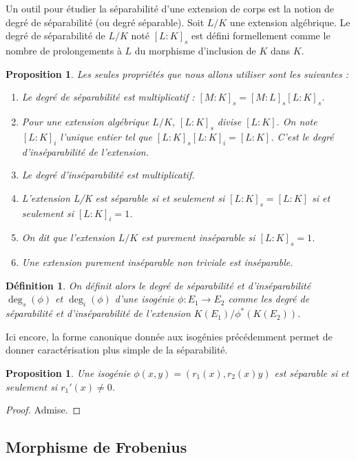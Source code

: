 \documentclass{article}
\theoremstyle{plain}%
\newtheorem{prop}[thm]{Proposition}
\newtheorem{deff}[thm]{Définition}
\theoremstyle{definition}%
\begin{document}
Un outil pour étudier la séparabilité d’une extension de corps est la notion de degré de séparabilité (ou
degré séparable). Soit $L/K$ une extension algébrique. Le degré de séparabilité de $L/K$ noté  $[L : K]_s$ est défini
formellement comme le nombre de prolongements à $L$ du morphisme d’inclusion de $K$ dans $K$. 

\begin{prop}
Les seules
propriétés que nous allons utiliser sont les suivantes :
  \begin{enumerate}
    \item Le degré de séparabilité est multiplicatif : $[M : K]_s = [M : L]_s [L : K]_s$.
    \item Pour une extension algébrique $L/K$, $[L : K]_s$ divise $[L : K]$. On note $[L:K]_i$ l'unique entier tel que $[L:K]_s[L:K]_i=[L:K]$. C'est le degré d'inséparabilité de l'extension. 
    \item Le degré d'inséparabilité est multiplicatif.
    \item L’extension L/K est séparable si et seulement si $[L : K]_s = [L : K]$ si et seulement si $[L:K]_i = 1$.
    \item On dit que l'extension $L/K$ est purement inséparable si $[L:K]_s = 1$.
    \item Une extension purement inséparable non triviale est inséparable.
  \end{enumerate}
\end{prop}


\begin{deff}
On définit alors le degré de séparabilité et d'inséparabilité $\deg_s(\phi)$ et $\deg_i(\phi)$ d’une isogénie $\phi : E_1 \to E_2$ comme les degré de séparabilité et d'inséparabilité de l’extension $K(E_1)/\phi^*(K(E_2 ))$.
\end{deff}


Ici encore, la forme canonique donnée aux isogénies précédemment permet de donner caractérisation plus
simple de la séparabilité.

\begin{prop}
  \label{caracsep}
  Une isogénie $\phi(x, y) = (r_1(x), r_2(x)y)$ est séparable si et seulement si $r_1'(x) \neq 0$.
\end{prop}

\begin{proof}
  Admise.
\end{proof}

\subsection{Morphisme de Frobenius}
\end{document}
